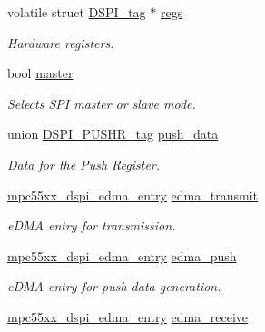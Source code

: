 \begin{DoxyCompactItemize}
volatile struct \mbox{\hyperlink{structDSPI__tag}{D\+S\+P\+I\+\_\+tag}} $\ast$ \mbox{\hyperlink{structmpc55xx__dspi__bus__entry_a357141a4e1a59a98148a6975bcdecef1}{regs}}
\begin{DoxyCompactList}\small\item\em Hardware registers. \end{DoxyCompactList}\item 
\mbox{\label{structmpc55xx__dspi__bus__entry_ad673ced880b73797451f044e689fbbc6}} 
bool \mbox{\hyperlink{structmpc55xx__dspi__bus__entry_ad673ced880b73797451f044e689fbbc6}{master}}
\begin{DoxyCompactList}\small\item\em Selects S\+PI master or slave mode. \end{DoxyCompactList}\item 
\mbox{\label{structmpc55xx__dspi__bus__entry_a46f8c05180aa377817a84c2e488d8bc9}} 
union \mbox{\hyperlink{unionDSPI__PUSHR__tag}{D\+S\+P\+I\+\_\+\+P\+U\+S\+H\+R\+\_\+tag}} \mbox{\hyperlink{structmpc55xx__dspi__bus__entry_a46f8c05180aa377817a84c2e488d8bc9}{push\+\_\+data}}
\begin{DoxyCompactList}\small\item\em Data for the Push Register. \end{DoxyCompactList}\item 
\mbox{\hyperlink{structmpc55xx__dspi__edma__entry}{mpc55xx\+\_\+dspi\+\_\+edma\+\_\+entry}} \mbox{\hyperlink{structmpc55xx__dspi__bus__entry_aac9a5d787e7586cc4590db83948fb61a}{edma\+\_\+transmit}}
\begin{DoxyCompactList}\small\item\em e\+D\+MA entry for transmission. \end{DoxyCompactList}\item 
\mbox{\hyperlink{structmpc55xx__dspi__edma__entry}{mpc55xx\+\_\+dspi\+\_\+edma\+\_\+entry}} \mbox{\hyperlink{structmpc55xx__dspi__bus__entry_ac263d52ae23b05e92f846a45c496cb67}{edma\+\_\+push}}
\begin{DoxyCompactList}\small\item\em e\+D\+MA entry for push data generation. \end{DoxyCompactList}\item 
\mbox{\hyperlink{structmpc55xx__dspi__edma__entry}{mpc55xx\+\_\+dspi\+\_\+edma\+\_\+entry}} \mbox{\hyperlink{structmpc55xx__dspi__bus__entry_abc95efcd6fa4691a4fb7e39efc5fcc70}{edma\+\_\+receive}}

\end{DoxyCompactItemize}

